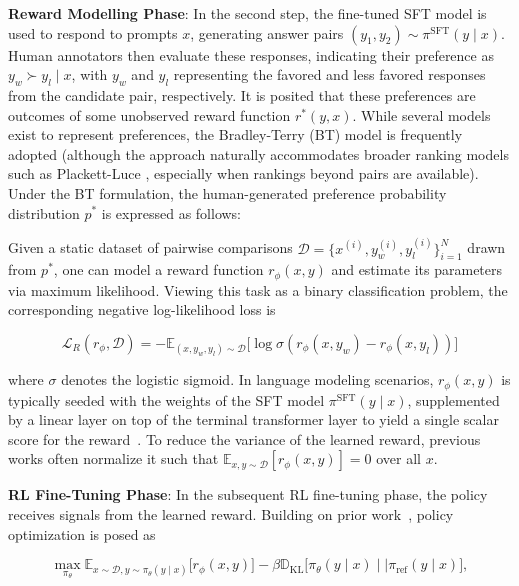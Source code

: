 \textbf{Reward Modelling Phase}: In the second step, the fine-tuned SFT model is used to respond to prompts $x$, generating answer pairs $(y_1, y_2)\sim \pi^\text{SFT}(y \mid x)$. Human annotators then evaluate these responses, indicating their preference as $y_w\succ y_l \mid x$, with $y_w$ and $y_l$ representing the favored and less favored responses from the candidate pair, respectively. It is posited that these preferences are outcomes of some unobserved reward function $r^*(y, x)$. While several models exist to represent preferences, the Bradley-Terry (BT) model \cite{bradley1952rankanalysis} is frequently adopted (although the approach naturally accommodates broader ranking models such as Plackett-Luce \citep{plackett1975analysis, luce2012individual}, especially when rankings beyond pairs are available). Under the BT formulation, the human-generated preference probability distribution $p^*$ is expressed as follows:

Given a static dataset of pairwise comparisons $\mathcal{D}=\bigl\{x^{(i)}, y_w^{(i)}, y_l^{(i)}\bigr\}_{i=1}^N$ drawn from $p^*$, one can model a reward function $r_{\phi}(x, y)$ and estimate its parameters via maximum likelihood. Viewing this task as a binary classification problem, the corresponding negative log-likelihood loss is

\begin{equation}\label{eq:reward_model}
    \mathcal{L}_R(r_{\phi}, \mathcal{D}) = -\mathbb{E}_{(x, y_w, y_l)\sim \mathcal{D}}\bigl[\log \sigma(r_{\phi}(x, y_w)- r_{\phi}(x, y_l))\bigr]
\end{equation}

where $\sigma$ denotes the logistic sigmoid. In language modeling scenarios, $r_{\phi}(x, y)$ is typically seeded with the weights of the SFT model $\pi^\text{SFT}(y \mid x)$, supplemented by a linear layer on top of the terminal transformer layer to yield a single scalar score for the reward~\cite{ziegler2020finetuning}. To reduce the variance of the learned reward, previous works often normalize it such that $\mathbb{E}_{x,y\sim \mathcal{D}}\left[r_\phi(x, y)\right] = 0$ over all $x$.

\textbf{RL Fine-Tuning Phase}: In the subsequent RL fine-tuning phase, the policy receives signals from the learned reward. Building on prior work~\citep{jaques2017sequence, jaques2020human}, policy optimization is posed as

\begin{equation}\label{eq:RL}
\max_{\pi_{\theta}}  \mathbb{E}_{x\sim \mathcal{D}, y\sim \pi_{\theta}(y \mid x)}\bigl[r_{\phi}(x, y)\bigr] - \beta\mathbb{D}_{\textrm{KL}}\bigl[\pi_{\theta}(y\mid x)\mid \mid \pi_\text{ref}(y\mid x)\bigr],
\end{equation}

